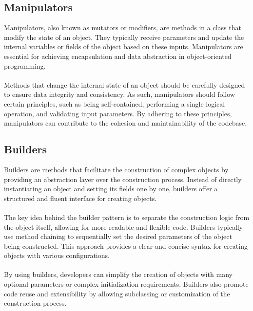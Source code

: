 \documentclass[draft]{article}
\begin{document}
\subsection{Manipulators}
Manipulators, also known as mutators or modifiers, are methods in a class that modify the state of an object. They typically receive parameters and update the internal variables or fields of the object based on these inputs. Manipulators are essential for achieving encapsulation and data abstraction in object-oriented programming.\\
~\\
Methods that change the internal state of an object should be carefully designed to ensure data integrity and consistency. As such, manipulators should follow certain principles, such as being self-contained, performing a single logical operation, and validating input parameters. By adhering to these principles, manipulators can contribute to the cohesion and maintainability of the codebase.
\subsection{Builders}
Builders are methods that facilitate the construction of complex objects by providing an abstraction layer over the construction process. Instead of directly instantiating an object and setting its fields one by one, builders offer a structured and fluent interface for creating objects.\\
~\\
The key idea behind the builder pattern is to separate the construction logic from the object itself, allowing for more readable and flexible code. Builders typically use method chaining to sequentially set the desired parameters of the object being constructed. This approach provides a clear and concise syntax for creating objects with various configurations.\\
~\\
By using builders, developers can simplify the creation of objects with many optional parameters or complex initialization requirements. Builders also promote code reuse and extensibility by allowing subclassing or customization of the construction process.
\end{document}

